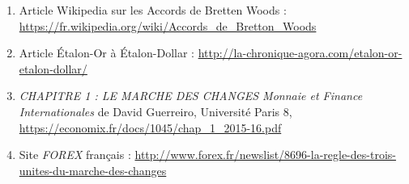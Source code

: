 \documentclass[a4paper, 11pt]{article}
\begin{document}
\begin{enumerate}
\item Article Wikipedia sur les Accords de Bretten Woods : \url{https://fr.wikipedia.org/wiki/Accords_de_Bretton_Woods} \label{wikipedia bretten woods}
\item Article Étalon-Or à Étalon-Dollar : \url{http://la-chronique-agora.com/etalon-or-etalon-dollar/} \label{étalon-or à étalon-dollar}
\item \textit{CHAPITRE 1 : LE MARCHE DES CHANGES Monnaie et Finance Internationales} de David Guerreiro, Université Paris 8, \url{https://economix.fr/docs/1045/chap_1_2015-16.pdf} \label{marche des changes}
\item Site \textit{FOREX} français : \url{http://www.forex.fr/newslist/8696-la-regle-des-trois-unites-du-marche-des-changes} \label{site fr forex}
\end{enumerate}
\end{document}
